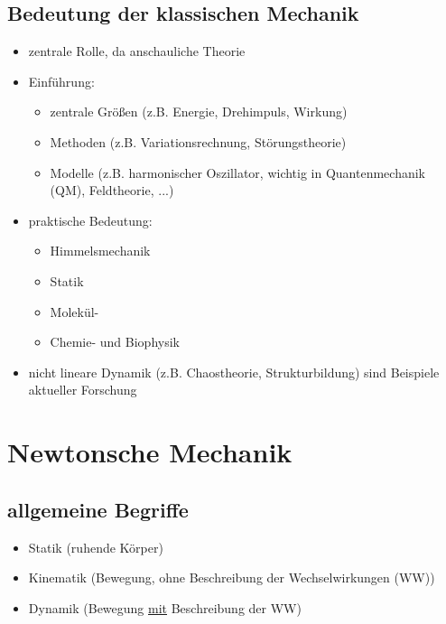 \documentclass[titlepage,12pt,a4paper,ngerman]{report}
\begin{document}
\section*{Bedeutung der klassischen Mechanik}
\begin{itemize}
	\item zentrale Rolle, da anschauliche Theorie
	\item Einführung:
	\begin{itemize}
		\item zentrale Größen (z.B. Energie, Drehimpuls, Wirkung)
		\item Methoden (z.B. Variationsrechnung, Störungstheorie)
		\item Modelle (z.B. harmonischer Oszillator, wichtig in Quantenmechanik (QM), Feldtheorie, ...)
	\end{itemize}
	\item praktische Bedeutung:
	\begin{itemize}
		\item Himmelsmechanik
		\item Statik
		\item Molekül-
		\item Chemie- und Biophysik
	\end{itemize}
	\item nicht lineare Dynamik (z.B. Chaostheorie, Strukturbildung) sind Beispiele aktueller Forschung
\end{itemize}

\chapter{Newtonsche Mechanik}
\section{allgemeine Begriffe}
\begin{itemize}
	\item Statik (ruhende Körper)
	\item Kinematik (Bewegung, ohne Beschreibung der Wechselwirkungen (WW))
	\item Dynamik (Bewegung \underline{mit} Beschreibung der WW)
\end{itemize}
\end{document}
